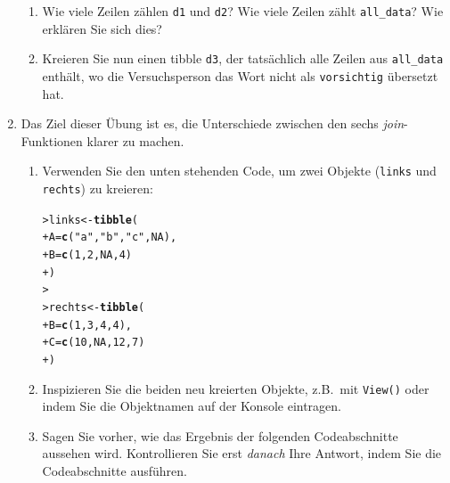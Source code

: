 \documentclass[oneside, 10pt]{book}\usepackage[]{graphicx}\usepackage[]{xcolor}
\makeatletter
\newcommand{\hlnum}[1]{\textcolor[rgb]{0.686,0.059,0.569}{#1}}%
\newcommand{\hlstr}[1]{\textcolor[rgb]{0.192,0.494,0.8}{#1}}%
\newcommand{\hlstd}[1]{\textcolor[rgb]{0.345,0.345,0.345}{#1}}%
\newcommand{\hlkwb}[1]{\textcolor[rgb]{0.69,0.353,0.396}{#1}}%
\newcommand{\hlkwc}[1]{\textcolor[rgb]{0.333,0.667,0.333}{#1}}%
\newcommand{\hlkwd}[1]{\textcolor[rgb]{0.737,0.353,0.396}{\textbf{#1}}}%
\newenvironment{kframe}{%
 \def\at@end@of@kframe{}%
 \ifinner\ifhmode%
  \def\at@end@of@kframe{\end{minipage}}%
  \begin{minipage}{\columnwidth}%
 \fi\fi%
 \def\FrameCommand##1{\hskip\@totalleftmargin \hskip-\fboxsep
 \colorbox{shadecolor}{##1}\hskip-\fboxsep
     \hskip-\linewidth \hskip-\@totalleftmargin \hskip\columnwidth}%
 \MakeFramed {\advance\hsize-\width
   \@totalleftmargin\z@ \linewidth\hsize
   \@setminipage}}%
 {\par\unskip\endMakeFramed%
 \at@end@of@kframe}
\newenvironment{knitrout}{}{} %
\makeatother
\begin{document}
\begin{enumerate}
\begin{enumerate}
  \item Wie viele Zeilen zählen \texttt{d1} und \texttt{d2}?
  Wie viele Zeilen zählt \texttt{all\_data}? Wie erklären Sie sich dies?

  \item Kreieren Sie nun einen tibble \texttt{d3}, der
  tatsächlich alle Zeilen aus
  \texttt{all\_data} enthält, wo die Versuchsperson das Wort nicht
  als \texttt{vorsichtig} übersetzt hat.
  \end{enumerate}

  \item Das Ziel dieser Übung ist es, die Unterschiede zwischen
  den sechs \textit{join}-Funktionen klarer zu machen.
  \begin{enumerate}
    \item Verwenden Sie den unten stehenden Code, um zwei Objekte
    (\texttt{links} und \texttt{rechts}) zu kreieren:
    
\begin{knitrout}
\color{fgcolor}\begin{kframe}
\begin{alltt}
\hlstd{> }\hlstd{links} \hlkwb{<-} \hlkwd{tibble}\hlstd{(}
\hlstd{+ }  \hlkwc{A} \hlstd{=} \hlkwd{c}\hlstd{(}\hlstr{"a"}\hlstd{,} \hlstr{"b"}\hlstd{,} \hlstr{"c"}\hlstd{,} \hlnum{NA}\hlstd{),}
\hlstd{+ }  \hlkwc{B} \hlstd{=} \hlkwd{c}\hlstd{(}\hlnum{1}\hlstd{,} \hlnum{2}\hlstd{,} \hlnum{NA}\hlstd{,} \hlnum{4}\hlstd{)}
\hlstd{+ }\hlstd{)}
\hlstd{> }
\hlstd{> }\hlstd{rechts} \hlkwb{<-} \hlkwd{tibble}\hlstd{(}
\hlstd{+ }  \hlkwc{B} \hlstd{=} \hlkwd{c}\hlstd{(}\hlnum{1}\hlstd{,} \hlnum{3}\hlstd{,} \hlnum{4}\hlstd{,} \hlnum{4}\hlstd{),}
\hlstd{+ }  \hlkwc{C} \hlstd{=} \hlkwd{c}\hlstd{(}\hlnum{10}\hlstd{,} \hlnum{NA}\hlstd{,} \hlnum{12}\hlstd{,} \hlnum{7}\hlstd{)}
\hlstd{+ }\hlstd{)}
\end{alltt}
\end{kframe}
\end{knitrout}
    \item Inspizieren Sie die beiden neu kreierten Objekte, z.B.\ mit \texttt{View()} oder indem Sie die Objektnamen auf der Konsole eintragen.
    
    \item Sagen Sie vorher, wie das Ergebnis der folgenden Codeabschnitte aussehen wird.
    Kontrollieren Sie erst \emph{danach} Ihre Antwort, indem Sie die Codeabschnitte ausführen.
    

\end{enumerate}
\end{enumerate}
\end{document}
